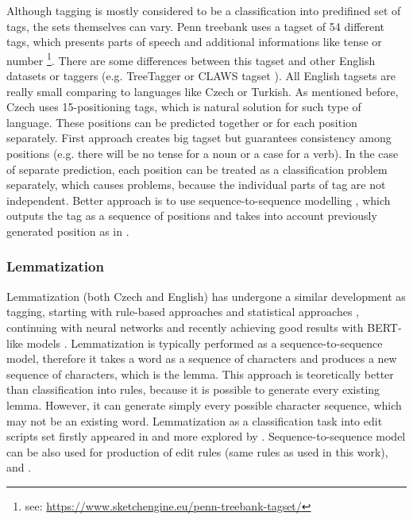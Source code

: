 Although tagging is mostly considered to be a classification into predifined set of tags, the sets themselves can vary. Penn treebank uses a tagset of 54 different tags, which presents parts of speech and additional informations like tense or number \footnote{see: \url{https://www.sketchengine.eu/penn-treebank-tagset/}}. There are some differences between this tagset and other English datasets or taggers (e.g. TreeTagger \citep{Schmid95improvementsin} or CLAWS tagset \citep{Chapelle1988TheCA}). All English tagsets are really small comparing to languages like Czech or Turkish. As mentioned before, Czech uses 15-positioning tags, which is  natural solution for such type of language. These positions can be predicted together or for each position separately. First approach creates big tagset but guarantees consistency among positions (e.g. there will be no tense for a noun or a case for a verb). In the case of separate prediction, each position can be treated as a classification problem separately, which causes problems, because the individual parts of tag are not independent. Better approach is to use sequence-to-sequence modelling \citep{Sutskever2014}, which outputs the tag as a sequence of positions and takes into account previously generated position as in \citep{malaviya-etal-2019-simple}.

\subsubsection{Lemmatization}
Lemmatization (both Czech and English) has undergone a similar development as tagging, starting with rule-based approaches and statistical approaches \citep{Plisson}, continuing with neural networks and recently achieving good results with BERT-like models \citep{Kondratyuk2019}.  Lemmatization is typically performed as a sequence-to-sequence model, therefore it takes a word as a sequence of characters and produces a new sequence of characters, which is the lemma. This approach is teoretically better than classification into rules, because it is possible to generate every existing lemma. However, it can generate simply every possible character sequence, which may not be an existing word. Lemmatization as a classification task into edit scripts set firstly appeared in \citep{Chrupala} and more explored by \citep{Straka2018}. 
Sequence-to-sequence model can be also used for production of edit rules (same rules as used in this work)\citep{chakrabarty2017context}, \citep{muller2015joint} and \citep{Yildiz2019}.

